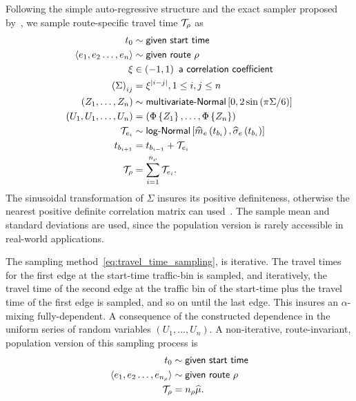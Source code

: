 \documentclass[12pt]{article}
\begin{document}
{{{{{{Following the simple auto-regressive structure and the exact sampler proposed by~\cite{falk1999simple}, we sample route-specific travel time $\mathcal{T}_\rho$ as 
\begin{equation} \label{eq:travel_time_sampling}
\begin{aligned}
    t_0 & \sim \textsf{given start time} \\
    \langle e_1, e_2 \dots, e_n \rangle & \sim \textsf{given route } \rho \\
    \xi & \in \left(-1,1\right) \textsf{ a correlation coefficient} \\
    \left(\Sigma\right)_{ij} & = \xi^{\left|i-j\right|}, 1 \leq i, j \leq n\\
    (Z_1, \dots, Z_n)  & \sim \textsf{multivariate-Normal}\left[0, 2\sin\left(\pi \Sigma/6\right)\right] \\
    (U_1, U_1, \dots, U_{n}) & = \left(\Phi\left\{Z_1\right\}, \dots, \Phi\left\{Z_n\right\}\right) \\
     \mathcal{T}_{e_i} &\sim \textsf{log-Normal}\left[{\widehat m}_e\left(t_{b_i}\right),{\widehat \sigma}_e\left(t_{b_i}\right)\right] \\
     t_{b_{i+1}}& = t_{b_{i-1}} + \mathcal{T}_{e_i} \\
    \mathcal{T}_\rho & = \sum_{i=1}^{n_\rho} \mathcal{T}_{e_i}. 
\end{aligned}
\end{equation}
The sinusoidal transformation of $\Sigma$ insures its positive definiteness, otherwise the nearest positive definite correlation matrix can used~\cite{higham2002computing}. The sample mean and standard deviations are used, since the population version is rarely accessible in real-world applications.

The sampling method~\eqref{eq:travel_time_sampling}, is iterative. The travel times for the first edge at the start-time traffic-bin is sampled, and iteratively, the travel time of the second edge at the traffic bin of the start-time plus the travel time of the first edge is sampled, and so on until the last edge. This insures an $\alpha$-mixing fully-dependent. A consequence of the constructed dependence in the uniform series of random variables $(U_1, \dots, U_n)$. A non-iterative, route-invariant, population version of this sampling process is
\begin{equation} \label{eq:travel_time_sampling-population}
\begin{aligned}
    t_0 & \sim \textsf{given start time} \\
    \langle e_1, e_2 \dots, e_{n_\rho} \rangle & \sim \textsf{given route } \rho \\
    \mathcal{T}_\rho & = n_\rho {\widehat\mu}.
\end{aligned}
\end{equation}

}}}}}}
\end{document}
